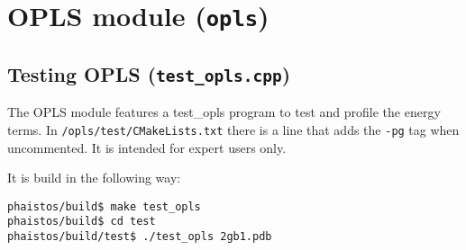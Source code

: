 \chapter{OPLS module (\texttt{opls})}
\label{cha:opls}

\section{Testing OPLS (\texttt{test\_opls.cpp})}

The OPLS module features a test\_opls program to test and profile the
energy terms. In \verb|/opls/test/CMakeLists.txt| there is a line that
adds the \verb|-pg| tag when uncommented. It is intended for expert
users only.

It is build in the following way:
\begin{verbatim}
phaistos/build$ make test_opls
phaistos/build$ cd test
phaistos/build/test$ ./test_opls 2gb1.pdb
\end{verbatim}


